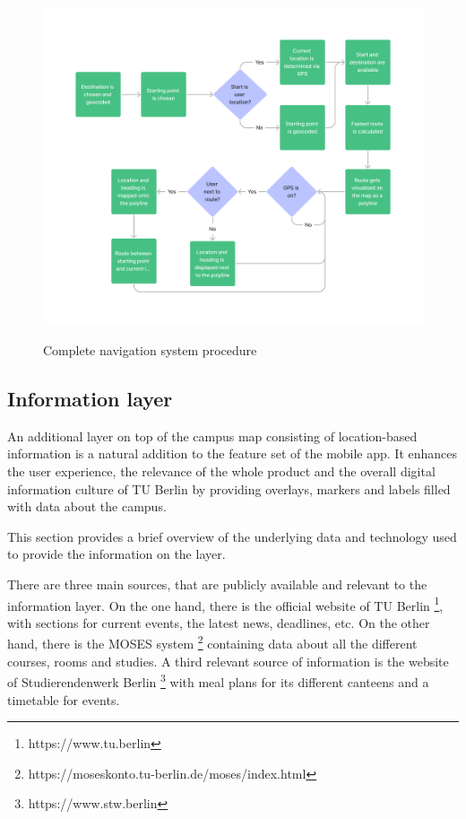 \begin{figure}[!ht]
	\centering
	\includegraphics[width=1.0\textwidth]{images/navigation_process.png}\\
	\caption{Complete navigation system procedure}
    \label{fig:navigation_system}
\end{figure}

\subsection{Information layer}
An additional layer on top of the campus map consisting of location-based information is a natural addition to the feature set of the mobile app. It enhances the user experience, the relevance of the whole product and the overall digital information culture of TU Berlin by providing overlays, markers and labels filled with data about the campus.

This section provides a brief overview of the underlying data and technology used to provide the information on the layer.

There are three main sources, that are publicly available and relevant to the information layer. On the one hand, there is the official website of TU Berlin \footnote{https://www.tu.berlin}, with sections for current events, the latest news, deadlines, etc. On the other hand, there is the MOSES system \footnote{https://moseskonto.tu-berlin.de/moses/index.html} containing data about all the different courses, rooms and studies. A third relevant source of information is the website of Studierendenwerk Berlin \footnote{https://www.stw.berlin} with meal plans for its different canteens and a timetable for events.

